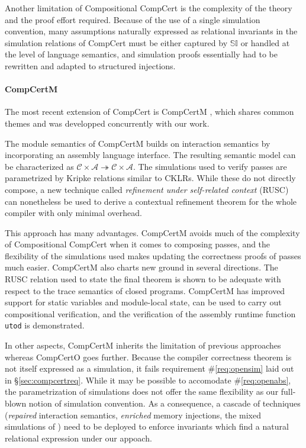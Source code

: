 \documentclass[acmsmall,authordraft]{acmart}
\begin{document}
Another limitation of Compositional CompCert
is the complexity of the theory
and the proof effort required.
Because of the use of a single simulation convention,
many assumptions naturally expressed as
relational invariants in the simulation relations of CompCert
must be either captured by $\mathbb{SI}$
or handled at the level of language semantics,
and simulation proofs
essentially had to be rewritten and adapted to
structured injections.


\paragraph{CompCertM} %

The most recent extension of CompCert is CompCertM \cite{compcertm},
which shares common themes and was developped concurrently
with our work.

The module semantics of CompCertM
builds on interaction semantics
by incorporating an assembly language interface.
The resulting semantic model can be characterized as
$\mathcal{C} \times \mathcal{A} \twoheadrightarrow
 \mathcal{C} \times \mathcal{A}$.
The simulations used to verify passes
are parametrized by Kripke relations similar to CKLRs.
While these do not directly compose,
a new technique called \emph{refinement under self-related context}
(RUSC)
can nonetheless be used to derive a contextual refinement theorem
for the whole compiler with only minimal overhead.

This approach has many advantages.
CompCertM avoids much of the complexity
of Compositional CompCert
when it comes to composing passes,
and the flexibility of the simulations used
makes updating the correctness proofs of passes much easier.
CompCertM also charts new ground in several directions.
The RUSC relation used to state the final theorem
is shown to be adequate with respect to the trace semantics
of closed programs.
CompCertM has improved support for static variables
and module-local state,
can be used to carry out compositional verification,
and the verification of
the assembly runtime function \texttt{utod} is demonstrated.

In other aspects,
CompCertM inherits the limitation of previous approaches
whereas CompCertO goes further.
Because the compiler correctness theorem
is not itself expressed as a simulation,
it fails requirement \#\ref{req:opensim}
laid out in \S\ref{sec:compcertreq}.
While it may be possible to accomodate \#\ref{req:openabs},
the parametrization of simulations
does not offer the same flexibility as
our full-blown notion of simulation convention.
As a consequence, a cascade of techniques
(\emph{repaired} interaction semantics,
\emph{enriched} memory injections,
the mixed simulations of \cite{pilsner})
need to be deployed to enforce invariants
which find a natural relational expression
under our appoach.
\end{document}
